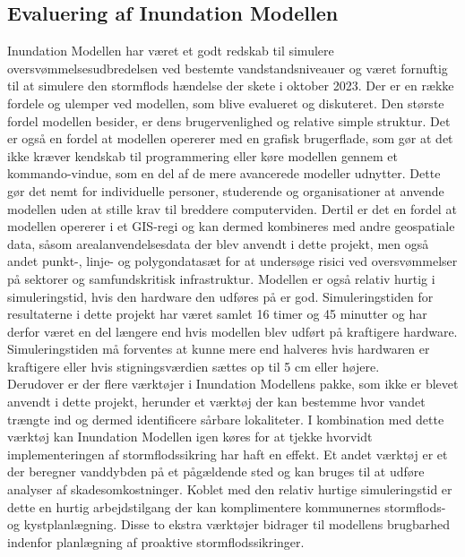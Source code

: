 \subsection{Evaluering af Inundation Modellen}
Inundation Modellen har været et godt redskab til simulere oversvømmelsesudbredelsen ved bestemte vandstandsniveauer og været fornuftig til at simulere den stormflods hændelse der skete i oktober 2023. Der er en række fordele og ulemper ved modellen, som blive evalueret og diskuteret.
Den største fordel modellen besider, er dens brugervenlighed og relative simple struktur. Det er også en fordel at modellen opererer med en grafisk brugerflade, som gør at det ikke kræver kendskab til programmering eller køre modellen gennem et kommando-vindue, som en del af de mere avancerede modeller udnytter. Dette gør det nemt for individuelle personer, studerende og organisationer at anvende modellen uden at stille krav til breddere computerviden. Dertil er det en fordel at modellen opererer i et GIS-regi og kan dermed kombineres med andre geospatiale data, såsom arealanvendelsesdata der blev anvendt i dette projekt, men også andet punkt-, linje- og polygondatasæt for at undersøge risici ved oversvømmelser på sektorer og samfundskritisk infrastruktur. Modellen er også relativ hurtig i simuleringstid, hvis den hardware den udføres på er god. Simuleringstiden for resultaterne i dette projekt har været samlet 16 timer og 45 minutter og har derfor været en del længere end hvis modellen blev udført på kraftigere hardware. Simuleringstiden må forventes at kunne mere end halveres hvis hardwaren er kraftigere eller hvis stigningsværdien sættes op til 5 cm eller højere.\\

Derudover er der flere værktøjer i Inundation Modellens pakke, som ikke er blevet anvendt i dette projekt, herunder et værktøj der kan bestemme hvor vandet trængte ind og dermed identificere sårbare lokaliteter. I kombination med dette værktøj kan Inundation Modellen igen køres for at tjekke hvorvidt implementeringen af stormflodssikring har haft en effekt. Et andet værktøj er et der beregner vanddybden på et pågældende sted og kan bruges til at udføre analyser af skadesomkostninger. Koblet med den relativ hurtige simuleringstid er dette en hurtig arbejdstilgang der kan komplimentere kommunernes stormflods- og kystplanlægning. Disse to ekstra værktøjer bidrager til modellens brugbarhed indenfor planlægning af proaktive stormflodssikringer.\\

